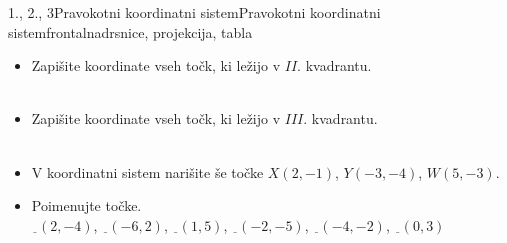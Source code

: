 \begin{priprava}{1., 2., 3}{}{Pravokotni koordinatni sistem}{Pravokotni koordinatni sistem}{frontalna}{drsnice, projekcija, tabla}
\begin{naloga}
\begin{multicols}{2}

    \begin{itemize}
        \item Zapišite koordinate vseh točk, ki ležijo v $II.$ kvadrantu. \\~\\
        \item Zapišite koordinate vseh točk, ki ležijo v $III.$ kvadrantu. \\~\\
        \item V koordinatni sistem narišite še točke $X(2,-1)$, $Y(-3,-4)$, $W(5,-3)$. \\
        \item Poimenujte točke. \\ $\underline{\ \ }(2,-4)$, $\underline{\ \ }(-6,2)$, $\underline{\ \ }(1,5)$,
                                    $\underline{\ \ }(-2,-5)$, $\underline{\ \ }(-4,-2)$, $\underline{\ \ }(0,3)$
    \end{itemize}
\end{multicols}
\end{naloga}


\end{priprava}
